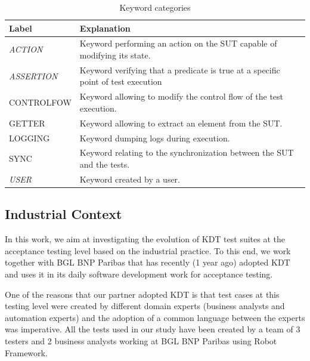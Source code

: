 \begin{table}
\caption{Keyword categories}
\label{keywords_categories}
\centering
\begin{tabular}{>{\raggedright}m{0.9in}>{\raggedright}m{2.3in}}
\toprule
\textbf{\scriptsize{Label}} & \textbf{\scriptsize{Explanation}}\tabularnewline
\toprule

\scriptsize{\textit{ACTION}}    & \scriptsize{Keyword performing an action on the
SUT capable of modifying its state.} \tabularnewline

\scriptsize{\textit{ASSERTION}} & \scriptsize{Keyword verifying that a predicate
is true at a specific point of test execution} \tabularnewline

\scriptsize{CONTROLFOW}         & \scriptsize{Keyword allowing to modify the
                                   control flow of the test execution.} \tabularnewline

\scriptsize{GETTER}             & \scriptsize{Keyword allowing to extract an element from
the SUT.} \tabularnewline

\scriptsize{LOGGING}            & \scriptsize{Keyword dumping logs during execution.}
\tabularnewline

\scriptsize{SYNC}               & \scriptsize{Keyword relating to the
                                  synchronization between the SUT and the tests.} \tabularnewline

\scriptsize{\textit{USER}}      & \scriptsize{Keyword created by a user.}
\tabularnewline

\bottomrule
\end{tabular}
\end{table} 

\subsection{Industrial Context}
\label{sec:evolution-introduction-data}

In this work, we aim at investigating the evolution of KDT test suites at the acceptance testing level based on the industrial practice. To this end, we work together with BGL BNP Paribas that has recently (1 year ago) adopted KDT and uses it in its daily software development work for acceptance testing.

One of the reasons that our partner adopted KDT is that test cases at this testing level were created by different domain experts (business analysts and automation experts) and the adoption of a common language between the experts was imperative. All the tests used in our study have been created by a team of 3 testers and 2 business analysts working at BGL BNP Paribas using Robot Framework.

